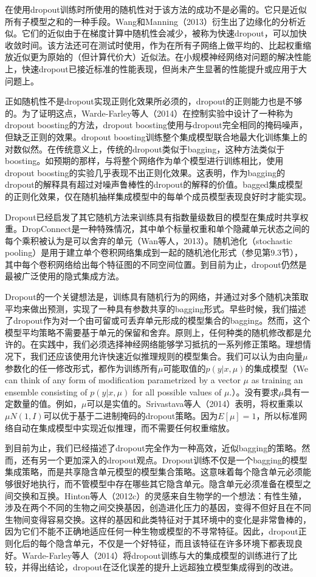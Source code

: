 在使用dropout训练时所使用的随机性对于该方法的成功不是必需的。它只是近似所有子模型之和的一种手段。Wang和Manning（2013）衍生出了边缘化的分析近似。它们的近似由于在梯度计算中随机性会减少，被称为快速dropout，可以加快收敛时间。该方法还可在测试时使用，作为在所有子网络上做平均的、比起权重缩放近似更为原始的（但计算代价大）近似法。在小规模神经网络对问题的解决性能上，快速dropout已接近标准的性能表现，但尚未产生显著的性能提升或应用于大问题上。

正如随机性不是dropout实现正则化效果所必须的，dropout的正则能力也是不够的。为了证明这点，Warde-Farley等人（2014）在控制实验中设计了一种称为dropout boosting的方法，dropout boosting使用与dropout完全相同的掩码噪声，但缺乏正则的效果。dropout boosting训练整个集成模型联合地最大化训练集上的对数似然。在传统意义上，传统的dropout类似于bagging，这种方法类似于boosting。如预期的那样，与将整个网络作为单个模型进行训练相比，使用dropout boosting的实验几乎表现不出正则化效果。这表明，作为bagging的dropout的解释具有超过对噪声鲁棒性的dropout的解释的价值。bagged集成模型的正则化效果，仅在随机抽样集成模型中的每单个成员模型表现良好时才能实现。

Dropout已经启发了其它随机方法来训练具有指数量级数目的模型在集成时共享权重。DropConnect是一种特殊情况，其中单个标量权重和单个隐藏单元状态之间的每个乘积被认为是可以舍弃的单元（Wan等人，2013）。随机池化（stochastic pooling）是用于建立单个卷积网络集成到一起的随机池化形式（参见第9.3节），其中每个卷积网络给出每个特征图的不同空间位置。到目前为止，dropout仍然是最被广泛使用的隐式集成方法。

Dropout的一个关键想法是，训练具有随机行为的网络，并通过对多个随机决策取平均来做出预测，实现了一种具有参数共享的bagging形式。早些时候，我们描述了dropout作为对一个由可留或可丢弃单元形成的模型集合的bagging。然而，这个模型平均策略不需要基于单元的保留和舍弃。原则上，任何种类的随机修改都是允许的。在实践中，我们必须选择神经网络能够学习抵抗的一系列修正策略。理想情况下，我们还应该使用允许快速近似推理规则的模型集合。我们可以认为由向量$\mu$参数化的任一修改形式，都作为训练所有$\mu$可能取值的$p(y | x, \mu)$的集成模型（We can think of any form of modiﬁcation parametrized by a vector $\mu$ as training an ensemble consisting of $p(y | x, \mu)$ for all possible values of $\mu$.）。没有要求$\mu$具有一定数量的值。例如，$\mu$可以是实值的。Srivastava等人（2014）表明，将权重乘以$\mu N(1,I)$可以优于基于二进制掩码的dropout策略。因为$E[\mu] = 1$，所以标准网络自动在集成模型中实现近似推理，而不需要任何权重缩放。

到目前为止，我们已经描述了dropout完全作为一种高效，近似bagging的策略。然而，还有另一个更加深入的dropout观点。Dropout训练不仅是一个bagging的模型集成策略，而是共享隐含单元模型的模型集合策略。这意味着每个隐含单元必须能够很好地执行，而不管模型中存在哪些其它隐含单元。隐含单元必须准备在模型之间交换和互换。Hinton等人（2012c）的灵感来自生物学的一个想法：有性生殖，涉及在两个不同的生物之间交换基因，创造进化压力的基因，变得不但好且在不同生物间变得容易交换。这样的基因和此类特征对于其环境中的变化是非常鲁棒的，因为它们不能不正确地适应任何一种生物或模型的不寻常特征。因此，dropout正则化后的每个隐含单元，不仅是一个好特征，而且该特征在许多环境下都表现良好。Warde-Farley等人（2014）将dropout训练与大的集成模型的训练进行了比较，并得出结论，dropout在泛化误差的提升上远超独立模型集成得到的改进。

